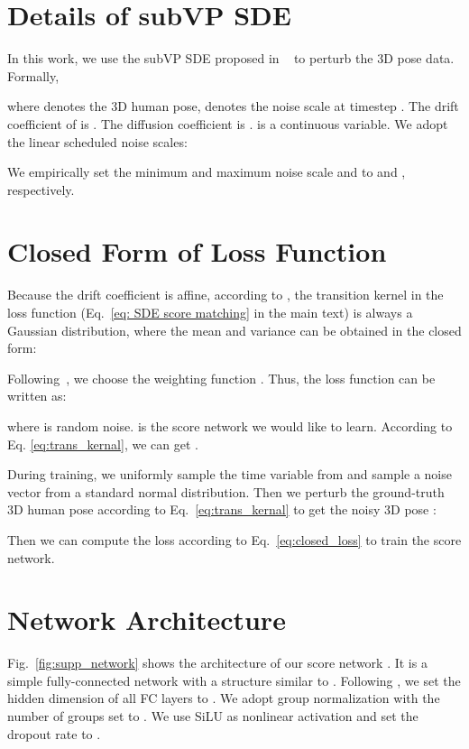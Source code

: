 \documentclass[10pt,twocolumn,letterpaper]{article}
\begin{document}
%
 
{\small


}

\clearpage


\appendix








\section{Details of subVP SDE}
In this work, we use the subVP SDE proposed in ~\cite{song2020score} to perturb the 3D pose data. Formally, 


where  denotes the 3D human pose,  denotes the noise scale at timestep .
The drift coefficient of  is . The diffusion coefficient is .
 is a continuous variable. We adopt the linear scheduled noise scales:


We empirically set the minimum and maximum noise scale  and  to  and , respectively.


\section{Closed Form of Loss Function}
Because the drift coefficient  is affine, according to \cite{song2020score}, the transition kernel  in the loss function (Eq.~\ref{eq: SDE score matching} in the main text) is always a Gaussian distribution, where the mean and variance can be obtained in the closed form:



Following~\cite{song2019generative}, we choose the weighting function . Thus, the loss function can be written as:

where  is random noise.  is the score network we would like to learn. According to Eq. \ref{eq:trans_kernal}, we can get .

During training, we uniformly sample the time variable  from  and sample a noise vector  from a standard normal distribution. Then we perturb the ground-truth 3D human pose  according to Eq.~\ref{eq:trans_kernal} to get the noisy 3D pose :


Then we can compute the loss according to Eq.~\ref{eq:closed_loss} to train the score network.

\section{Network Architecture}
Fig.~\ref{fig:supp_network} shows the architecture of our score network . It is a simple fully-connected network with a structure similar to \cite{martinez_2017_3dbaseline}. Following \cite{martinez_2017_3dbaseline}, we set the hidden dimension of all FC layers to . We adopt group normalization \cite{wu2018group} with the number of groups set to . We use SiLU \cite{hendrycks2016gaussian} as nonlinear activation and set the dropout rate to .
\end{document}
